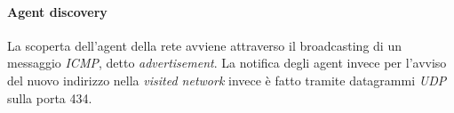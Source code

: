 \paragraph{Agent discovery}
La scoperta dell'agent della rete avviene attraverso il broadcasting di un messaggio \textit{ICMP}, detto \textit{advertisement}. La notifica degli agent invece per l'avviso del nuovo indirizzo nella \textit{visited network} invece è fatto tramite datagrammi \textit{UDP} sulla porta 434.